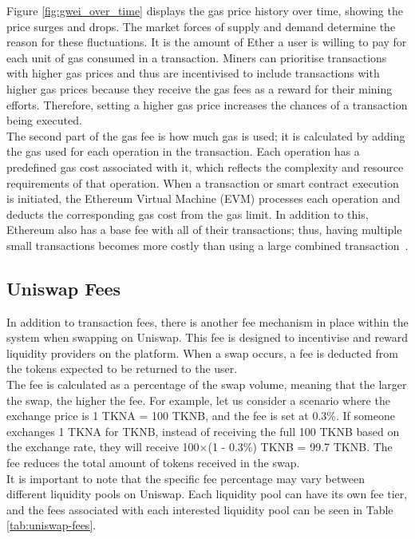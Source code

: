 \noindent Figure \ref{fig:gwei_over_time} displays the gas price history over time, showing the price surges and drops. The market forces of supply and demand determine the reason for these fluctuations. It is the amount of Ether a user is willing to pay for each unit of gas consumed in a transaction. Miners can prioritise transactions with higher gas prices and thus are incentivised to include transactions with higher gas prices because they receive the gas fees as a reward for their mining efforts. Therefore, setting a higher gas price increases the chances of a transaction being executed.
\\[3mm]
The second part of the gas fee is how much gas is used; it is calculated by adding the gas used for each operation in the transaction. Each operation has a predefined gas cost associated with it, which reflects the complexity and resource requirements of that operation. When a transaction or smart contract execution is initiated, the Ethereum Virtual Machine (EVM) processes each operation and deducts the corresponding gas cost from the gas limit. In addition to this, Ethereum also has a base fee with all of their transactions; thus, having multiple small transactions becomes more costly than using a large combined transaction~\cite{noauthor_gas_nodate}.

\subsection{Uniswap Fees}
In addition to transaction fees, there is another fee mechanism in place within the system when swapping on Uniswap. This fee is designed to incentivise and reward liquidity providers on the platform. When a swap occurs, a fee is deducted from the tokens expected to be returned to the user.
\\[3mm]
The fee is calculated as a percentage of the swap volume, meaning that the larger the swap, the higher the fee. For example, let us consider a scenario where the exchange price is 1 TKNA = 100 TKNB, and the fee is set at 0.3\%. If someone exchanges 1 TKNA for TKNB, instead of receiving the full 100 TKNB based on the exchange rate, they will receive 100$\times$(1 - 0.3\%) TKNB = 99.7 TKNB. The fee reduces the total amount of tokens received in the swap.
\\[3mm]
It is important to note that the specific fee percentage may vary between different liquidity pools on Uniswap. Each liquidity pool can have its own fee tier, and the fees associated with each interested liquidity pool can be seen in Table \ref{tab:uniswap-fees}.


